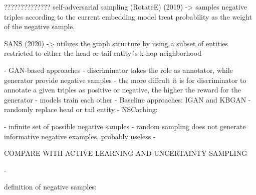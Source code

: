 ??????????????
    self-adversarial sampling (RotateE) (2019)
    -> samples negative triples according to the current embedding model
    treat probability as the weight of the negative sample.

    SANS (2020)
    -> utilizes the graph structure by using a subset of entities restricted to either the head or tail entity´s k-hop neighborhood






- GAN-based approaches
- discriminator takes the role as annotator, while generator provide negative samples
- the more diffcult it is for discriminator to annotate a given triples as positive or negative, the higher the reward for the generator
- models train each other
- Baseline approaches: IGAN and KBGAN
- randomly replace head or tail entity
- NSCaching: 

- infinite set of possible negative samples
- random sampling does not generate informative negative examples, probably useless
- 


COMPARE WITH ACTIVE LEARNING AND UNCERTAINTY SAMPLING



\cite{safavi2021negater}
- 


\cite{zhang2021efficient}





definition of negative samples:
